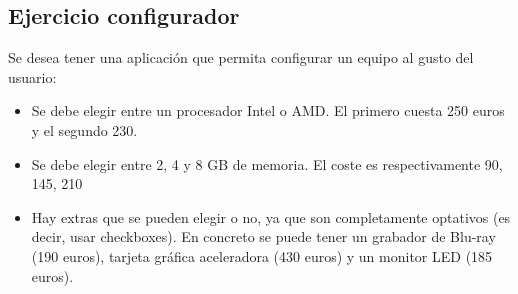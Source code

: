 \documentclass[letterpaper,10pt,spanish]{sphinxmanual}
\begin{document}
\subsection{Ejercicio configurador}
\label{\detokenize{tema4:ejercicio-configurador}}
Se desea tener una aplicación que permita configurar un equipo al gusto del usuario:
\begin{itemize}
\item {} 
Se debe elegir entre un procesador Intel o AMD. El primero cuesta 250 euros y el segundo 230.

\item {} 
Se debe elegir entre 2, 4 y 8 GB de memoria. El coste es respectivamente 90, 145, 210

\item {} 
Hay extras que se pueden elegir o no, ya que son completamente optativos (es decir, usar checkboxes). En concreto se puede tener un grabador de Blu-ray (190 euros), tarjeta gráfica aceleradora (430 euros) y un monitor LED (185 euros).

\end{itemize}
\end{document}

